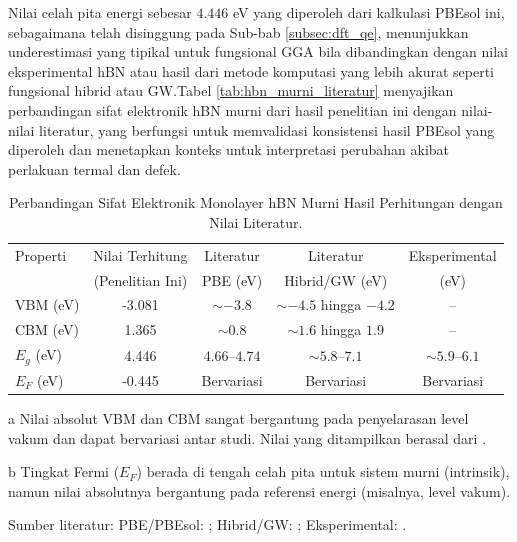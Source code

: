 Nilai celah pita energi sebesar $4.446$ eV yang diperoleh dari kalkulasi PBEsol ini, sebagaimana telah disinggung pada Sub-bab \ref{subsec:dft_qe}, menunjukkan underestimasi yang tipikal untuk fungsional GGA bila dibandingkan dengan nilai eksperimental hBN atau hasil dari metode komputasi yang lebih akurat seperti fungsional hibrid atau GW.Tabel \ref{tab:hbn_murni_literatur} menyajikan perbandingan sifat elektronik hBN murni dari hasil penelitian ini dengan nilai-nilai literatur, yang berfungsi untuk memvalidasi konsistensi hasil PBEsol yang diperoleh dan menetapkan konteks untuk interpretasi perubahan akibat perlakuan termal dan defek. 
\begin{table}[h!]
  \centering
  \caption{Perbandingan Sifat Elektronik Monolayer hBN Murni Hasil Perhitungan dengan Nilai Literatur.}
  \label{tab:hbn_murni_literatur_updated}
  \begin{threeparttable}
    \begin{tabular}{lcccc}
      \toprule
      Properti & Nilai Terhitung & Literatur & Literatur & Eksperimental \\
               & (Penelitian Ini) & PBE (eV)   & Hibrid/GW (eV) & (eV)         \\
      \midrule
      VBM (eV)  & -3.081          & $\sim -3.8$\tnote{a}      & $\sim -4.5$ hingga $-4.2$ & – \\
      CBM (eV)  & 1.365           & $\sim 0.8$\tnote{a}       & $\sim 1.6$ hingga $1.9$   & – \\
      $E_g$ (eV)& 4.446           & $4.66$–$4.74$             & $\sim 5.8$–$7.1$          & $\sim 5.9$–$6.1$ \\
      $E_F$ (eV)& -0.445          & Bervariasi\tnote{b}       & Bervariasi\tnote{b}       & Bervariasi\tnote{b} \\
      \bottomrule
    \end{tabular}
    \begin{tablenotes}[flushleft]
      \footnotesize
      \item[a] Nilai absolut VBM dan CBM sangat bergantung pada penyelarasan level vakum dan dapat bervariasi antar studi. Nilai yang ditampilkan berasal dari \citep{liu2024}.
      \item[b] Tingkat Fermi ($E_F$) berada di tengah celah pita untuk sistem murni (intrinsik), namun nilai absolutnya bergantung pada referensi energi (misalnya, level vakum).
      \item Sumber literatur: PBE/PBEsol: \citep{liu2024,korkmaz2020}; Hibrid/GW: \citep{arnaud2006}; Eksperimental: \citep{Watanabe2004}.
    \end{tablenotes}
  \end{threeparttable}
\end{table}

